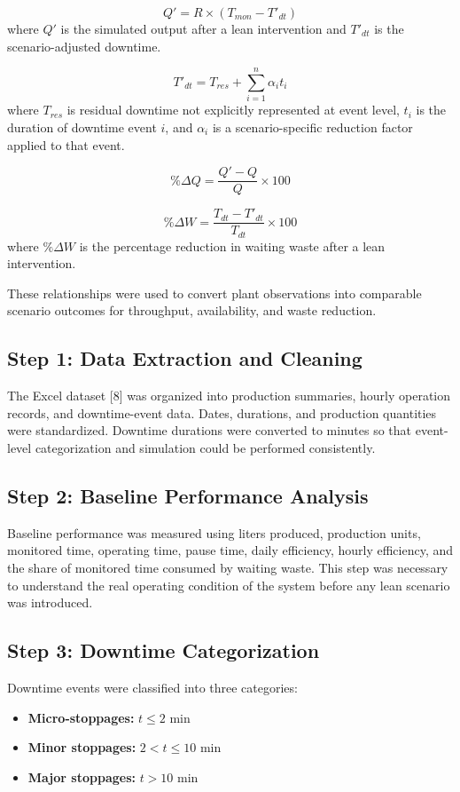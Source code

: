 \documentclass[12pt,a4paper]{article}
\begin{document}
\begin{equation}
Q' = R \times (T_{mon} - T'_{dt})
\end{equation}
where $Q'$ is the simulated output after a lean intervention and $T'_{dt}$ is the scenario-adjusted downtime.

\begin{equation}
T'_{dt} = T_{res} + \sum_{i=1}^{n}\alpha_i t_i
\end{equation}
where $T_{res}$ is residual downtime not explicitly represented at event level, $t_i$ is the duration of downtime event $i$, and $\alpha_i$ is a scenario-specific reduction factor applied to that event.

\begin{equation}
\%\Delta Q = \frac{Q' - Q}{Q}\times 100
\end{equation}

\begin{equation}
\%\Delta W = \frac{T_{dt} - T'_{dt}}{T_{dt}}\times 100
\end{equation}
where $\%\Delta W$ is the percentage reduction in waiting waste after a lean intervention.

These relationships were used to convert plant observations into comparable scenario outcomes for throughput, availability, and waste reduction.

\subsection{Step 1: Data Extraction and Cleaning}
The Excel dataset [8] was organized into production summaries, hourly operation records, and downtime-event data. Dates, durations, and production quantities were standardized. Downtime durations were converted to minutes so that event-level categorization and simulation could be performed consistently.

\subsection{Step 2: Baseline Performance Analysis}
Baseline performance was measured using liters produced, production units, monitored time, operating time, pause time, daily efficiency, hourly efficiency, and the share of monitored time consumed by waiting waste. This step was necessary to understand the real operating condition of the system before any lean scenario was introduced.

\subsection{Step 3: Downtime Categorization}
Downtime events were classified into three categories:
\begin{itemize}
    \item \textbf{Micro-stoppages:} $t \leq 2$ min
    \item \textbf{Minor stoppages:} $2 < t \leq 10$ min
    \item \textbf{Major stoppages:} $t > 10$ min
\end{itemize}
\end{document}
